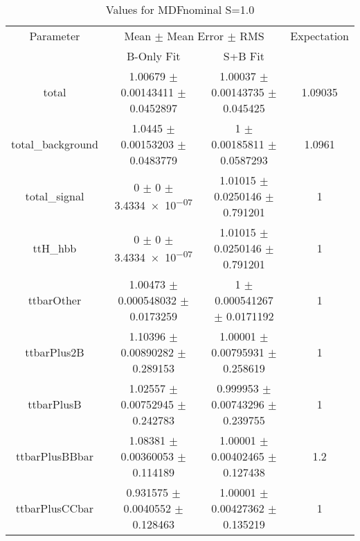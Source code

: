 \begin{table}
\centering
\caption{Values for MDFnominal S=1.0}
\begin{tabular}{cccc}
\toprule
Parameter & \multicolumn{2}{c}{Mean $\pm$ Mean Error $\pm$ RMS} & Expectation\\
 & B-Only Fit & S+B Fit & \\
\midrule
total & \num{1.00679} $\pm$ \num{0.00143411} $\pm$ \num{0.0452897} & \num{1.00037} $\pm$ \num{0.00143735} $\pm$ \num{0.045425} & \num{1.09035}\\
total\_background & \num{1.0445} $\pm$ \num{0.00153203} $\pm$ \num{0.0483779} & \num{1} $\pm$ \num{0.00185811} $\pm$ \num{0.0587293} & \num{1.0961}\\
total\_signal & \num{0} $\pm$ \num{0} $\pm$ \num{3.4334e-07} & \num{1.01015} $\pm$ \num{0.0250146} $\pm$ \num{0.791201} & \num{1}\\
ttH\_hbb & \num{0} $\pm$ \num{0} $\pm$ \num{3.4334e-07} & \num{1.01015} $\pm$ \num{0.0250146} $\pm$ \num{0.791201} & \num{1}\\
ttbarOther & \num{1.00473} $\pm$ \num{0.000548032} $\pm$ \num{0.0173259} & \num{1} $\pm$ \num{0.000541267} $\pm$ \num{0.0171192} & \num{1}\\
ttbarPlus2B & \num{1.10396} $\pm$ \num{0.00890282} $\pm$ \num{0.289153} & \num{1.00001} $\pm$ \num{0.00795931} $\pm$ \num{0.258619} & \num{1}\\
ttbarPlusB & \num{1.02557} $\pm$ \num{0.00752945} $\pm$ \num{0.242783} & \num{0.999953} $\pm$ \num{0.00743296} $\pm$ \num{0.239755} & \num{1}\\
ttbarPlusBBbar & \num{1.08381} $\pm$ \num{0.00360053} $\pm$ \num{0.114189} & \num{1.00001} $\pm$ \num{0.00402465} $\pm$ \num{0.127438} & \num{1.2}\\
ttbarPlusCCbar & \num{0.931575} $\pm$ \num{0.0040552} $\pm$ \num{0.128463} & \num{1.00001} $\pm$ \num{0.00427362} $\pm$ \num{0.135219} & \num{1}\\
\bottomrule
\end{tabular}
\end{table}